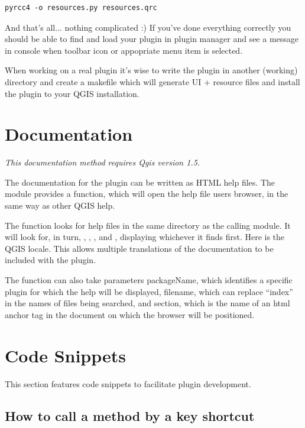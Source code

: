 \documentclass[letterpaper,10pt,english]{manual}
\begin{document}
\begin{Verbatim}[commandchars=@\[\]]
pyrcc4 -o resources.py resources.qrc
\end{Verbatim}

And that's all... nothing complicated :)
If you've done everything correctly you should be able to find and load your plugin in plugin manager and see a message in console
when toolbar icon or appopriate menu item is selected.

When working on a real plugin it's wise to write the plugin in another (working) directory and create a makefile which will
generate UI + resource files and install the plugin to your QGIS installation.


\section{Documentation}

\emph{This documentation method requires Qgis version 1.5.}

The documentation for the plugin can be written as HTML help files. The  module provides a function, 
which will open the help file users browser, in the same way as other QGIS help.

The  function looks for help files in the same directory as the calling module.
It will look for, in turn, , , ,  and ,
displaying whichever it finds first. Here  is the QGIS locale. This allows multiple translations of the documentation to be included with the plugin.

The  function can also take parameters packageName, which identifies a specific plugin for which the help will be displayed,
filename, which can replace ``index'' in the names of files being searched, and section, which is the name of an html anchor tag in the document
on which the browser will be positioned.


\section{Code Snippets}

This section features code snippets to facilitate plugin development.


\subsection{How to call a method by a key shortcut}
\end{document}
